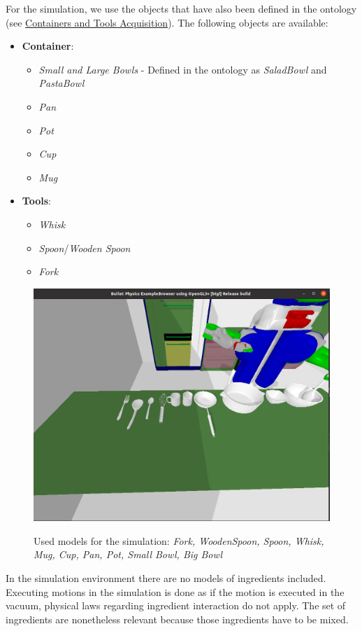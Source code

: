 For the simulation, we use the objects that have also been defined in the ontology (see \hyperref[sec:ContainersAndToolsAcquisition]{Containers and Tools Acquisition}).
The following objects are available:
\begin{itemize}
	\item \textbf{Container}: 
        \begin{itemize} 
            \item \textit{Small and Large Bowls} - Defined in the ontology as \textit{SaladBowl} and \textit{PastaBowl}
            \item \textit{Pan}
            \item \textit{Pot}
            \item \textit{Cup}
            \item \textit{Mug}
        \end{itemize}
	\item \textbf{Tools}: 
        \begin{itemize}
            \item \textit{Whisk}
            \item \textit{Spoon}/\textit{Wooden Spoon}
            \item \textit{Fork}
        \end{itemize}
\end{itemize}

\begin{figure}[H]
    \includegraphics[scale=0.35]{Graphics/toolscontainersmodels.png}
    \label{fig:toolscontainersmodels}
    \caption{Used models for the simulation: \textit{Fork, WoodenSpoon, Spoon, Whisk, Mug, Cup, Pan, Pot, Small Bowl, Big Bowl}}
\end{figure}
In the simulation environment there are no models of ingredients included. Executing motions in the simulation is done as if the motion is executed in 
the vacuum, physical laws regarding ingredient interaction do not apply. The set of ingredients are nonetheless relevant because those ingredients have to be mixed.

